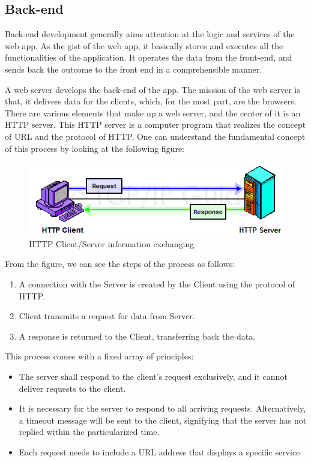 \documentclass[a4paper, 11pt,openany]{book} %
\begin{document}
\subsection{Back-end}
Back-end development generally aims attention at the logic and services of the web app. As the gist of the web app, it basically stores and executes all the functionalities of the application. It operates the data from the front-end, and sends back the outcome to the front end in a comprehensible manner. \par

A web server develops the back-end of the app. The mission of the web server is that, it delivers data for the clients, which, for the most part, are the browsers. There are various elements that make up a web server, and the center of it is an HTTP server. This HTTP server is a computer program that realizes the concept of URL and the protocol of HTTP. One can understand the fundamental concept of this process by looking at the following figure:

\begin{figure}[H]
    \centering
    \includegraphics{images/httpclientserver.png}
    \caption{HTTP Client/Server information exchanging}
    \label{fig:protocalExample}
\end{figure}
From the figure, we can see the steps of the process as follows:
\begin{enumerate}
    \item A connection with the Server is created by the Client using the protocol of HTTP.
    \item Client transmits a request for data from Server.
    \item A response is returned to the Client, transferring back the data.
\end{enumerate}
This process comes with a fixed array of principles:
\begin{itemize}
    \item The server shall respond to the client's request exclusively, and it cannot deliver requests to the client. 
    \item It is necessary for the server to respond to all arriving requests. Alternatively, a timeout message will be sent to the client, signifying that the server has not replied within the particularized time.
    \item Each request needs to include a URL address that displays a specific service 
\end{itemize}
\end{document}
